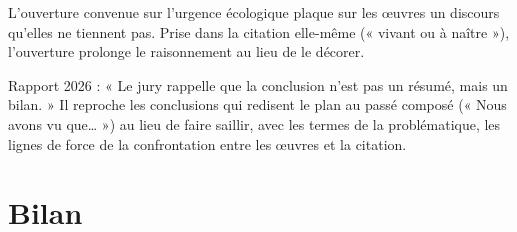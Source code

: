 \documentclass[11pt,a4paper]{article}
\begin{document}
\begin{piege}

L'ouverture convenue sur l'urgence écologique plaque sur les œuvres un discours qu'elles ne tiennent pas. Prise dans la citation elle-même (« vivant ou à naître »), l'ouverture prolonge le raisonnement au lieu de le décorer.

\end{piege}

\begin{jury}

Rapport 2026 : « Le jury rappelle que la conclusion n'est pas un résumé, mais un bilan. » Il reproche les conclusions qui redisent le plan au passé composé (« Nous avons vu que\ldots{} ») au lieu de faire saillir, avec les termes de la problématique, les lignes de force de la confrontation entre les œuvres et la citation.

\end{jury}

\hypertarget{bilan}{%
\section{Bilan}\label{bilan}}
\end{document}
